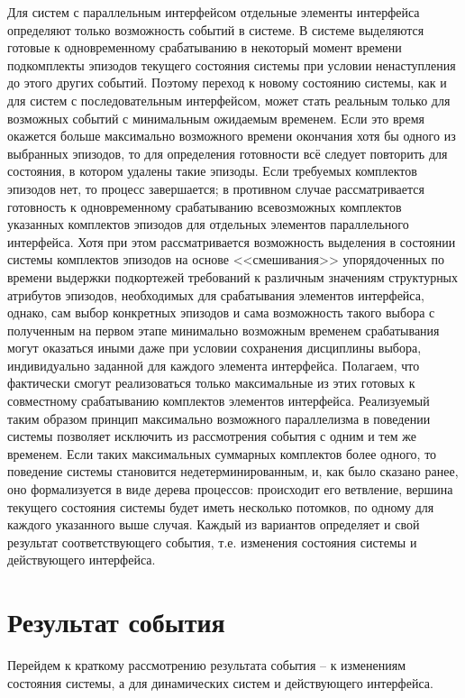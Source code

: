 Для систем с параллельным интерфейсом отдельные элементы интерфейса определяют только возможность событий в системе. В системе выделяются готовые к одновременному срабатыванию в некоторый момент времени подкомплекты эпизодов текущего состояния системы при условии ненаступления до этого других событий. Поэтому переход к новому состоянию системы, как и для систем с последовательным интерфейсом, может стать реальным только для возможных событий с минимальным ожидаемым временем. Если это время окажется больше максимально возможного времени окончания хотя бы одного из выбранных эпизодов, то для определения готовности всё следует повторить для состояния, в котором удалены такие эпизоды. Если требуемых комплектов эпизодов нет, то процесс завершается; в противном случае рассматривается готовность к одновременному срабатыванию всевозможных комплектов указанных комплектов эпизодов для отдельных элементов параллельного интерфейса. Хотя при этом рассматривается возможность выделения в состоянии системы комплектов эпизодов на основе <<смешивания>> упорядоченных по времени выдержки подкортежей требований к различным значениям структурных атрибутов эпизодов, необходимых для срабатывания элементов интерфейса, однако, сам выбор конкретных эпизодов и сама возможность такого выбора с полученным на первом этапе минимально возможным временем срабатывания могут оказаться иными даже при условии сохранения дисциплины выбора, индивидуально заданной для каждого элемента интерфейса. Полагаем, что фактически смогут реализоваться только максимальные из этих готовых к совместному срабатыванию комплектов элементов интерфейса. Реализуемый таким образом принцип максимально возможного параллелизма в поведении системы позволяет исключить из рассмотрения события с одним и тем же временем. Если таких максимальных суммарных комплектов более одного, то поведение системы становится недетерминированным, и, как было сказано ранее, оно формализуется в виде дерева процессов: происходит его ветвление, вершина текущего состояния системы будет иметь несколько потомков, по одному для каждого указанного выше случая. Каждый из вариантов определяет и свой результат соответствующего события, т.е. изменения состояния системы и действующего интерфейса. 

\section{Результат события}
Перейдем к краткому рассмотрению результата события – к изменениям состояния системы, а для динамических систем и действующего интерфейса. 

